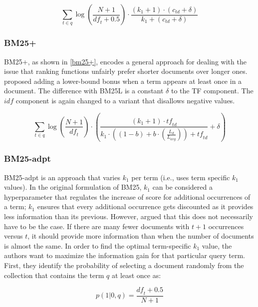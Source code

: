 \begin{equation}
	\label{bm25l}
	\sum_{t\in q} \log\left(\frac{N+1}{\mathit{df}_t + 0.5}\right)\cdot\frac{(k_1 + 1)\cdot(c_{\mathit{td}} + \delta)}{k_1 + (c_{\mathit{td}} + \delta)}
\end{equation}

\subsubsection{BM25+~\citep{bm25+}}
BM25+, as shown in \cref{bm25+}, encodes a general approach for dealing with the issue that ranking functions unfairly prefer shorter documents over longer ones.  proposed adding a lower-bound bonus when a term appears at least once in a document. The difference with BM25L is a constant $\delta$ to the TF component. The $\mathit{idf}$ component is again changed to a variant that disallows negative values.

\begin{equation}
	\label{bm25+}
	\sum_{t\in q} \log\left(\frac{N+1}{\mathit{df}_t}\right)\cdot\left(\frac{\left(k_1 + 1\right)\cdot \mathit{tf}_{\mathit{td}}}{k_1\cdot\left(\left(1-b\right)+b\cdot\left(\frac{L_d}{L_{\mathit{avg}}}\right)\right)+\mathit{tf}_{\mathit{td}}}+\delta\right)
\end{equation}

\subsubsection{BM25-adpt~\citep{bm25-adpt}}
BM25-adpt is an approach that varies $k_1$ per term (i.e., uses term specific $k_1$ values). In the original formulation of BM25, $k_1$ can be considered a hyperparameter that regulates the increase of score for additional occurrences of a term; $k_1$ ensures that every additional occurrence gets discounted as it provides less information than its previous. However, \citeauthor{bm25-adpt} argued that this does not necessarily have to be the case. If there are many fewer documents with $t+1$ occurrences versus $t$, it should provide more information than when the number of documents is almost the same. In order to find the optimal term-specific $k_1$ value, the authors want to maximize the information gain for that particular query term. 
First, they identify the probability of selecting a document randomly from the collection that contains the term $q$ at least once as:

\begin{equation}
	p(1|0,q) = \frac{\mathit{df}_t+0.5}{N+1}
\end{equation}

